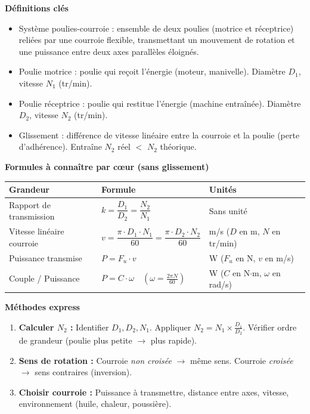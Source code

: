 \documentclass[11pt]{article}
\newcommand{\cle}[1]{{\popxbold\color{popdark}#1}}
\begin{document}
\begin{bilan}
\textbf{Définitions clés}
\begin{itemize}
    \item \cle{Système poulies-courroie} : ensemble de deux poulies (motrice et réceptrice) reliées par une courroie flexible, transmettant un mouvement de rotation et une puissance entre deux axes parallèles éloignés.
    \item \cle{Poulie motrice} : poulie qui reçoit l'énergie (moteur, manivelle). Diamètre $D_1$, vitesse $N_1$ (tr/min).
    \item \cle{Poulie réceptrice} : poulie qui restitue l'énergie (machine entraînée). Diamètre $D_2$, vitesse $N_2$ (tr/min).
    \item \cle{Glissement} : différence de vitesse linéaire entre la courroie et la poulie (perte d'adhérence). Entraîne $N_2$ réel $<$ $N_2$ théorique.
\end{itemize}

\textbf{Formules à connaître par cœur (sans glissement)}
\begin{center}
\begin{tabularx}{\linewidth}{|>{\centering}X|>{\centering}X|>{\centering\arraybackslash}X|}
\hline
\rowcolor{popblueL}
\textbf{Grandeur} & \textbf{Formule} & \textbf{Unités} \\
\hline
Rapport de transmission & $k = \dfrac{D_1}{D_2} = \dfrac{N_2}{N_1}$ & Sans unité \\
\hline
Vitesse linéaire courroie & $v = \dfrac{\pi \cdot D_1 \cdot N_1}{60} = \dfrac{\pi \cdot D_2 \cdot N_2}{60}$ & m/s ($D$ en m, $N$ en tr/min) \\
\hline
Puissance transmise & $P = F_u \cdot v$ & W ($F_u$ en N, $v$ en m/s) \\
\hline
Couple / Puissance & $P = C \cdot \omega \quad (\omega = \frac{2\pi N}{60})$ & W ($C$ en N$\cdot$m, $\omega$ en rad/s) \\
\hline
\end{tabularx}
\end{center}

\textbf{Méthodes express}
\begin{enumerate}
    \item \textbf{Calculer $N_2$ :} Identifier $D_1, D_2, N_1$. Appliquer $N_2 = N_1 \times \frac{D_1}{D_2}$. Vérifier ordre de grandeur (poulie plus petite $\rightarrow$ plus rapide).
    \item \textbf{Sens de rotation :} Courroie \emph{non croisée} $\rightarrow$ même sens. Courroie \emph{croisée} $\rightarrow$ sens contraires (inversion).
    \item \textbf{Choisir courroie :} Puissance à transmettre, distance entre axes, vitesse, environnement (huile, chaleur, poussière).
\end{enumerate}


\end{bilan}
\end{document}
